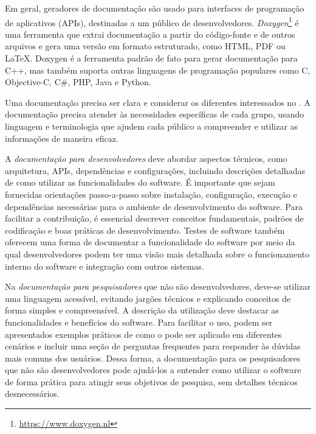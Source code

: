 Em geral, geradores de documentação são usado para interfaces de programação de aplicativos (APIs), destinadas a um público de desenvolvedores. 
\textit{Doxygen}\footnote{\url{https://www.doxygen.nl}} é uma ferramenta que extrai documentação a partir do código-fonte e de outros arquivos e gera uma versão em formato estruturado, como HTML, PDF ou LaTeX. 
%
Doxygen é a ferramenta padrão de fato para gerar documentação para C++, mas também suporta outras linguagens de programação populares como C, Objective-C, C\#, PHP, Java e Python.

Uma documentação precisa ser clara e considerar os diferentes interessados no \RS. A documentação precisa atender às necessidades específicas de cada grupo, usando linguagem e terminologia que ajudem cada público a compreender e utilizar as informações de maneira eficaz.

A \textit{documentação para desenvolvedores} deve abordar aspectos técnicos, como arquitetura, APIs, dependências e configurações, incluindo descrições detalhadas de como utilizar as funcionalidades do software. É importante que sejam fornecidas orientações passo-a-passo sobre instalação, configuração, execução e dependências necessárias para o ambiente de desenvolvimento do software. 
Para facilitar a contribuição, é essencial descrever conceitos fundamentais, padrões de codificação e boas práticas de desenvolvimento.
Testes de software também oferecem uma forma de documentar a funcionalidade do software por meio da
qual desenvolvedores podem ter uma visão mais detalhada sobre o funcionamento interno do software e integração com outros sistemas.

Na \textit{documentação para pesquisadores} que não são desenvolvedores, deve-se utilizar uma linguagem acessível, evitando jargões técnicos e explicando conceitos de forma simples e compreensível. 
A descrição da utilização deve destacar as  funcionalidades e benefícios do software. 
Para facilitar o uso, podem ser apresentados exemplos práticos de como o \RSw pode ser aplicado em diferentes cenários e incluir uma seção de perguntas frequentes para responder às dúvidas mais comuns dos usuários. Dessa forma, a documentação para os pesquisadores que não são desenvolvedores pode ajudá-los a entender como utilizar o software de forma prática para atingir seus objetivos de pesquisa, sem detalhes técnicos desnecessários.

